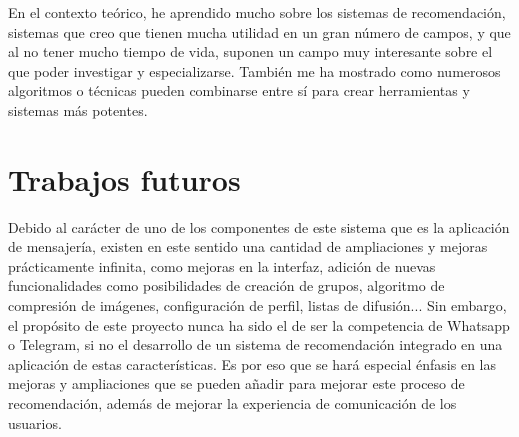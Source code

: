 En el contexto teórico, he aprendido mucho sobre los sistemas de recomendación, sistemas que creo que tienen mucha utilidad en un gran número de campos, y que al no tener mucho tiempo de vida, suponen un campo muy interesante sobre el que poder investigar y especializarse. También me ha mostrado como numerosos algoritmos o técnicas pueden combinarse entre sí para crear herramientas y sistemas más potentes.

\section{Trabajos futuros}

Debido al carácter de uno de los componentes de este sistema que es la aplicación de mensajería, existen en este sentido una cantidad de ampliaciones y mejoras prácticamente infinita, como mejoras en la interfaz, adición de nuevas funcionalidades como posibilidades de creación de grupos, algoritmo de compresión de imágenes, configuración de perfil, listas de difusión... Sin embargo, el propósito de este proyecto nunca ha sido el de ser la competencia de Whatsapp o Telegram, si no el desarrollo de un sistema de recomendación integrado en una aplicación de estas características. Es por eso que se hará especial énfasis en las mejoras y ampliaciones que se pueden añadir para mejorar este proceso de recomendación, además de mejorar la experiencia de comunicación de los usuarios.


